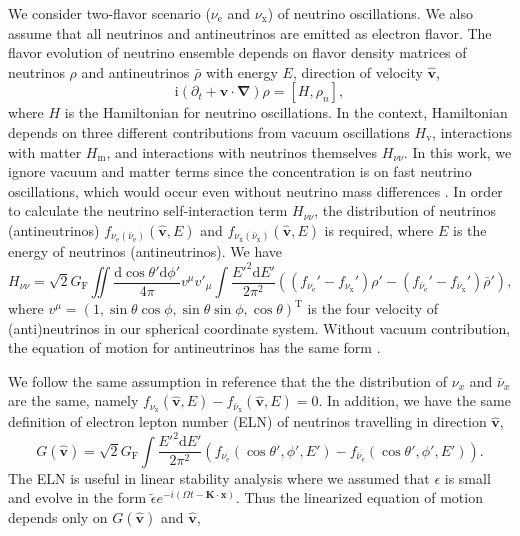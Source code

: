 \documentclass[%
preprint,
 amsmath,amssymb,
 aps,
 prd
]{revtex4-1}
\newcommand{\ii}{\mathrm i}
\begin{document}
We consider two-flavor scenario ($\nu_{\mathrm e}$ and $\nu_{\mathrm x}$) of neutrino oscillations. We also assume that all neutrinos and antineutrinos are emitted as electron flavor. The flavor evolution of neutrino ensemble depends on flavor density matrices of neutrinos $\rho$ and antineutrinos $\bar\rho$ with energy $E$, direction of velocity $\hat{\mathbf v}$,
\begin{equation}
\ii (\partial_t + \mathbf v\cdot \mathbf{\nabla}) \rho = \left[H, \rho_n \right],
\label{eqn-liouville-eqn}
\end{equation}
where $H$ is the Hamiltonian for neutrino oscillations. In the context, Hamiltonian depends on three different contributions from vacuum oscillations $H_{\mathrm v}$, interactions with matter $H_{\mathrm m}$, and interactions with neutrinos themselves $H_{\nu\nu}$. In this work, we ignore vacuum and matter terms since the concentration is on fast neutrino oscillations, which would occur even without neutrino mass differences \cite{Chakraborty2016,Dasgupta2017}. In order to calculate the neutrino self-interaction term $H_{\nu\nu}$, the distribution of neutrinos (antineutrinos) $f_{\nu_{\mathrm e}(\bar \nu_{\mathrm e})}(\hat{\mathbf v}, E)$ and $f_{\nu_{\mathrm x}(\bar \nu_{\mathrm x})}(\hat{\mathbf v}, E)$ is required, where $E$ is the energy of neutrinos (antineutrinos). We have
\begin{equation}
H_{\nu\nu} = \sqrt{2} G_{\mathrm F} \iint \frac{\mathrm d \cos\theta' \mathrm d\phi'}{4\pi} v^\mu v'_\mu \int \frac{E'^2 \mathrm d E'}{2\pi^2} \left( (f_{\nu_{\mathrm e}}' - f_{\nu_{\mathrm x}}' )\rho' -  (f_{\bar\nu_{\mathrm e}}' - f_{\bar\nu_{\mathrm x}}' ) \bar\rho' \right),
\end{equation}
where $v^\mu = ( 1, \sin\theta\cos\phi, \sin\theta\sin\phi, \cos\theta )^{\mathrm T}$ is the four velocity of (anti)neutrinos in our spherical coordinate system. Without vacuum contribution, the equation of motion for antineutrinos has the same form \cite{Duan2010}.

We follow the same assumption in reference  that the the distribution of $\nu_x$ and $\bar\nu_x$ are the same, namely $ f_{\nu_{\mathrm x}}(\hat{\mathbf v},E)  - f_{\bar\nu_{\mathrm x}}(\hat{\mathbf v},E)=0$. In addition, we have the same definition of electron lepton number (ELN) of neutrinos travelling in direction $\hat{\mathbf v}$,
\begin{equation}
G(\hat{\mathbf v}) =  \sqrt{2}G_{\mathrm F} \int \frac{E'^2 \mathrm d E'}{2\pi^2} ( f_{\nu_{\mathrm e}}(\cos\theta',\phi',E')  - f_{\bar\nu_{\mathrm e}}(\cos\theta',\phi',E')  ).
\end{equation}
The ELN is useful in linear stability analysis where we assumed that $\epsilon$ is small and evolve in the form $\tilde\epsilon e^{-i(\Omega t - \mathbf K\cdot \mathbf x)}$. Thus the linearized equation of motion depends only on $G(\hat{\mathbf v})$ and $\hat{\mathbf v}$,
\begin{equation}

\end{equation}
\end{document}
